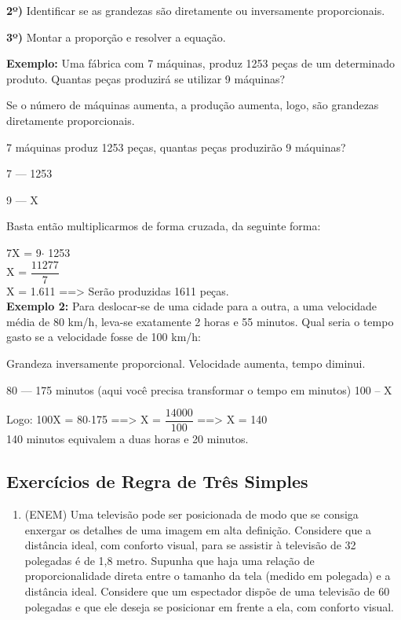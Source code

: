 \begin{multicols*}{2}
\textbf{2º)} Identificar se as grandezas são diretamente ou inversamente proporcionais.

\textbf{3º)} Montar a proporção e resolver a equação.
		
		\textbf{Exemplo:} Uma fábrica com 7 máquinas, produz 1253 peças de um determinado produto. Quantas peças produzirá se utilizar 9 máquinas?
		
		Se o número de máquinas aumenta, a produção aumenta, logo, são grandezas diretamente proporcionais.
		
		7 máquinas produz 1253 peças, quantas peças produzirão 9 máquinas?
		
		7  ---   1253
		
		9  ---      X
		
		Basta então multiplicarmos de forma cruzada, da seguinte forma:
		
		7X = 9$\cdot$ 1253  \\
		
		X = $\dfrac{11277}{7}$\\
		
		X = 1.611  ==> Serão produzidas 1611 peças.\\
		
		\textbf{Exemplo 2:} Para deslocar-se de uma cidade para a outra, a uma velocidade média de 80 km/h, leva-se exatamente 2 horas e 55 minutos. Qual seria o tempo gasto se a velocidade fosse de 100 km/h:
		
		Grandeza inversamente proporcional. Velocidade aumenta, tempo diminui.
		
		80  ---  175 minutos (aqui você precisa transformar o tempo em minutos)
		100 --    X  
		
		Logo:   100X = 80$\cdot$175    ==>  X = $\dfrac{14000}{100}$    ==>   X = 140\\
		
		140 minutos equivalem a duas horas e 20 minutos.
		
		\subsection{Exercícios de Regra de Três Simples}
		
			\begin{enumerate}
			
			\item (ENEM) Uma televisão pode ser posicionada de modo que se consiga enxergar os detalhes de uma imagem em alta definição. Considere que a distância ideal, com conforto visual, para se assistir à televisão de 32 polegadas
é de 1,8 metro. Supunha que haja uma relação de proporcionalidade direta entre o tamanho da tela (medido
em polegada) e a distância ideal. Considere que um espectador dispõe de uma televisão de 60 polegadas e que
ele deseja se posicionar em frente a ela, com conforto visual.


\end{enumerate}
\end{multicols*}
